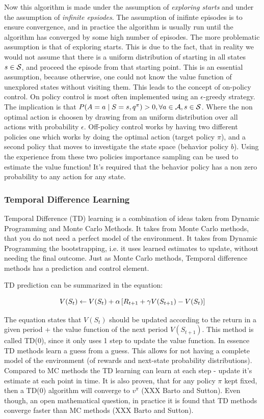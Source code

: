 Now this algorithm is made under the assumption of \textit{exploring starts} and under the assumption of \textit{infinite epsiodes}. The assumption of inifinte episodes is to ensure convergence, and in practice the algorithm is usually run until the algorithm has converged by some high number of episodes. The more problematic assumption is that of exploring starts. This is due to the fact, that in reality we would not assume that there is a uniform distribution of starting in all states $s \in \mathcal{S}$, and proceed the episode from that starting point. This is an essential assumption, because otherwise, one could not know the value function of unexplored states without visiting them. This leads to the concept of on-policy control. On policy control is most often implemented using an $\epsilon$-greedy strategy. The implication is that $P(A=a \mid S=s, q^{\pi}) > 0, \forall a \in \mathcal{A}, s \in \mathcal{S}$. Where the non optimal action is choosen by drawing from an uniform distribution over all actions with probability $\epsilon$. Off-policy control works by having two different policies one which works by doing the optimal action (target policy $\pi$), and a second policy that moves to investigate the state space (behavior policy $b$). Using the experience from these two policies importance sampling can be used to estimate the value function! It's required that the behavior policy has a non zero probability to any action for any state.

\subsubsection{Temporal Difference Learning}

Temporal Difference (TD) learning is a combination of ideas taken from Dynamic Programming and Monte Carlo Methods. It takes from Monte Carlo methods, that you do not need a perfect model of the environment. It takes from Dynamic Programming the bootstrapping, i.e. it uses learned estimates to update, without needing the final outcome. Just as Monte Carlo methods, Temporal difference methods has a prediction and control element. 

TD prediction can be summarized in the equation:

\begin{equation}
    V(S_t) \leftarrow V(S_t) + \alpha \left[ R_{t+1} + \gamma V(S_{t+1}) - V(S_t) \right]
\end{equation}

The equation states that $V(S_t)$ should be updated according to the return in a given period + the value function of the next period $V(S_{t+1})$. This method is called TD(0), since it only uses 1 step to update the value function. In essence TD methods learn a guess from a guess. This allows for not having a complete model of the environment (of rewards and next-state probability distributions). Compared to MC methods the TD learning can learn at each step - update it's estimate at each point in time. It is also proven, that for any policy $\pi$ kept fixed, then a TD(0) algorithm will converge to $v^{\pi}$ (XXX Barto and Sutton). Even though, an open mathematical question, in practice it is found that TD methods converge faster than MC methods (XXX Barto and Sutton).

